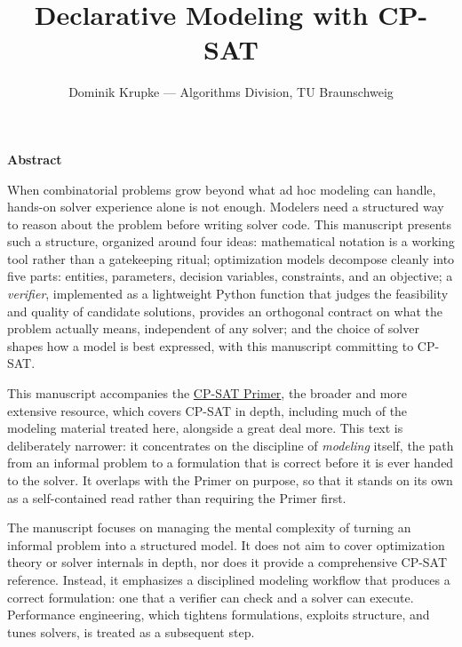 \documentclass[11pt]{report}
\title{Declarative Modeling with CP-SAT}
\author{Dominik Krupke --- Algorithms Division, TU Braunschweig}
\date{}
\begin{document}
\maketitle

\thispagestyle{empty}
\vspace*{2cm}
\begin{center}
{\Large\bfseries Abstract}
\end{center}
\vspace{0.8cm}
\noindent
When combinatorial problems grow beyond what ad hoc modeling can handle,
hands-on solver experience alone is not enough. Modelers need a structured way
to reason about the problem before writing solver code. This manuscript
presents such a structure, organized around four ideas: mathematical notation
is a working tool rather than a gatekeeping ritual; optimization models
decompose cleanly into five parts: entities, parameters, decision variables,
constraints, and an objective; a \emph{verifier}, implemented as a lightweight
Python function that judges the feasibility and quality of candidate solutions,
provides an orthogonal contract on what the problem actually means,
independent of any solver; and the choice of solver shapes how a model is best
expressed, with this manuscript committing to CP-SAT.

\vspace{0.6cm}
\noindent
This manuscript accompanies the
\href{https://github.com/d-krupke/cpsat-primer}{CP-SAT Primer}, the broader and
more extensive resource, which covers CP-SAT in depth, including much of the
modeling material treated here, alongside a great deal more. This text is
deliberately narrower: it concentrates on the discipline of \emph{modeling}
itself, the path from an informal problem to a formulation that is correct
before it is ever handed to the solver. It overlaps with the Primer on
purpose, so that it stands on its own as a self-contained read rather than
requiring the Primer first.

\vspace{0.6cm}
\noindent
The manuscript focuses on managing the mental complexity of turning an
informal problem into a structured model. It does not aim to cover
optimization theory or solver internals in depth, nor does it provide a
comprehensive CP-SAT reference. Instead, it emphasizes a disciplined modeling
workflow that produces a correct formulation: one that a verifier can check
and a solver can execute. Performance engineering, which tightens formulations,
exploits structure, and tunes solvers, is treated as a subsequent step.
\end{document}
